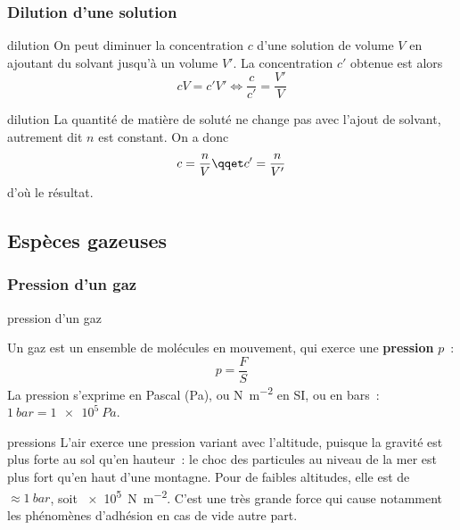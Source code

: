 \documentclass[../main/main.tex]{subfiles}
\begin{document}
\subsubsection{Dilution d'une solution}

\begin{tcbraster}[raster columns=2, raster equal height=rows]
    \begin{prop}[label=prop:dilu]{dilution}
        On peut diminuer la concentration $c$ d'une solution de volume $V$ en
        ajoutant du solvant jusqu'à un volume $V'$. La concentration $c'$
        obtenue est alors
        \[\boxed{cV = c'V'}
          \Longleftrightarrow
          \boxed{\frac{c}{c'} = \frac{V'}{V}}
      \]
    \end{prop}
    \begin{demo}[label=demo:dilu]{dilution}
        La quantité de matière de soluté ne change pas avec l'ajout de solvant,
        autrement dit $n$ est constant. On a donc
        \[ c = \frac{n}{V} \qqet c' = \frac{n}{V'}\]
        d'où le résultat.
    \end{demo}
\end{tcbraster}

\vspace{-20pt}
\subsection{Espèces gazeuses}
\subsubsection{Pression d'un gaz}

\begin{tcbraster}[raster columns=2, raster equal height=rows]
    \begin{defi}[label=def:pression]{pression d'un gaz}

        Un gaz est un ensemble de molécules en mouvement, qui exerce une
        \textbf{pression} $p$~:
        \[\boxed{p = \frac{F}{S}}\]
        La pression s'exprime en Pascal (Pa), ou \si{N.m^{-2}} en SI,
        ou en bars~: $\SI{1}{bar} = \SI{1e5}{Pa}$.
    \end{defi}
    \begin{exem}[label=exem:pression]{pressions}
        L'air exerce une pression variant avec l'altitude, puisque la gravité
        est plus forte au sol qu'en hauteur~: le choc des particules au niveau
        de la mer est plus fort qu'en haut d'une montagne. Pour de faibles
        altitudes, elle est de $\approx \SI{1}{bar}$, soit \SI{e5}{N.m^{-2}}.
        C'est une très grande force qui cause notamment les phénomènes
        d'adhésion en cas de vide autre part.
    \end{exem}
\end{tcbraster}
\end{document}
